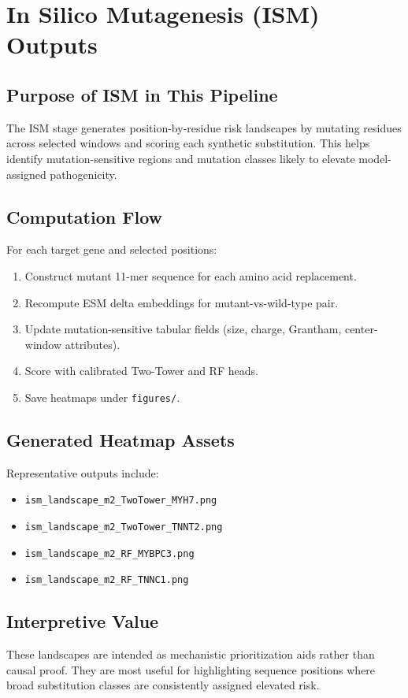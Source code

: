 \documentclass[11pt,a4paper]{article}
\begin{document}
\section{In Silico Mutagenesis (ISM) Outputs}
\subsection{Purpose of ISM in This Pipeline}
The ISM stage generates position-by-residue risk landscapes by mutating residues across selected windows and scoring each synthetic substitution. This helps identify mutation-sensitive regions and mutation classes likely to elevate model-assigned pathogenicity.

\subsection{Computation Flow}
For each target gene and selected positions:
\begin{enumerate}[leftmargin=1.2cm]
    \item Construct mutant 11-mer sequence for each amino acid replacement.
    \item Recompute ESM delta embeddings for mutant-vs-wild-type pair.
    \item Update mutation-sensitive tabular fields (size, charge, Grantham, center-window attributes).
    \item Score with calibrated Two-Tower and RF heads.
    \item Save heatmaps under \texttt{figures/}.
\end{enumerate}

\subsection{Generated Heatmap Assets}
Representative outputs include:
\begin{itemize}[leftmargin=1.2cm]
    \item \texttt{ism\_landscape\_m2\_TwoTower\_MYH7.png}
    \item \texttt{ism\_landscape\_m2\_TwoTower\_TNNT2.png}
    \item \texttt{ism\_landscape\_m2\_RF\_MYBPC3.png}
    \item \texttt{ism\_landscape\_m2\_RF\_TNNC1.png}
\end{itemize}

\subsection{Interpretive Value}
These landscapes are intended as mechanistic prioritization aids rather than causal proof. They are most useful for highlighting sequence positions where broad substitution classes are consistently assigned elevated risk.
\end{document}
